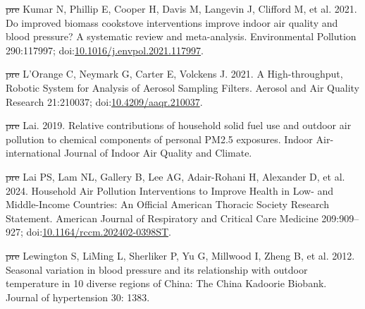 \documentclass[
  letterpaper,
  DIV=11,
  numbers=noendperiod]{scrartcl}
\newlength{\cslhangindent}
\newenvironment{CSLReferences}[2] %
 {\begin{list}{}{%
  \setlength{\itemindent}{0pt} %
  \setlength{\leftmargin}{0pt} %
  \setlength{\parsep}{0pt} %
  \ifodd #1
   \setlength{\leftmargin}{\cslhangindent} %
   \setlength{\itemindent}{-1\cslhangindent} %
  \fi
  \setlength{\itemsep}{#2\baselineskip}}} %
 {\end{list}} %
\providecommand{\DIFdel}[1]{{\protect\color{red}\sout{#1}}}                      %
\providecommand{\DIFaddbegin}{} %
\providecommand{\DIFaddend}{} %
\providecommand{\DIFdelbegin}{} %
\providecommand{\DIFdelend}{} %
\newcommand{\DIFscaledelfig}{0.5}
\newlength{\DIFdelgraphicswidth} %
\newlength{\DIFdelgraphicsheight} %
\newcommand{\DIFaddincludegraphics}[2][]{{\color{blue}\fbox{\DIFOincludegraphics[#1]{#2}}}} %
\newcommand{\DIFdelincludegraphics}[2][]{%
\sbox{\DIFdelgraphicsbox}{\DIFOincludegraphics[#1]{#2}}%
\settoboxwidth{\DIFdelgraphicswidth}{\DIFdelgraphicsbox} %
\settoboxtotalheight{\DIFdelgraphicsheight}{\DIFdelgraphicsbox} %
\scalebox{\DIFscaledelfig}{%
\parbox[b]{\DIFdelgraphicswidth}{\usebox{\DIFdelgraphicsbox}\\[-\baselineskip] \rule{\DIFdelgraphicswidth}{0em}}\llap{\resizebox{\DIFdelgraphicswidth}{\DIFdelgraphicsheight}{%
\setlength{\unitlength}{\DIFdelgraphicswidth}%
\begin{picture}(1,1)%
\thicklines\linethickness{2pt} %
{\color[rgb]{1,0,0}\put(0,0){\framebox(1,1){}}}%
{\color[rgb]{1,0,0}\put(0,0){\line( 1,1){1}}}%
{\color[rgb]{1,0,0}\put(0,1){\line(1,-1){1}}}%
\end{picture}%
}\hspace*{3pt}}} %
} %
\DeclareRobustCommand{\DIFaddbegin}{\DIFOaddbegin \let\includegraphics\DIFaddincludegraphics} %
\DeclareRobustCommand{\DIFaddend}{\DIFOaddend \let\includegraphics\DIFOincludegraphics} %
\DeclareRobustCommand{\DIFdelbegin}{\DIFOdelbegin \let\includegraphics\DIFdelincludegraphics} %
\DeclareRobustCommand{\DIFdelend}{\DIFOaddend \let\includegraphics\DIFOincludegraphics} %
\begin{document}
\begin{CSLReferences}{1}{1}
\DIFdelbegin %
\DIFdel{pre}%
\DIFdelend \DIFaddbegin {}
\DIFaddend Kumar N, Phillip E, Cooper H, Davis M, Langevin J, Clifford M, et al.
2021. Do improved biomass cookstove interventions improve indoor air
quality and blood pressure? {A} systematic review and meta-analysis.
Environmental Pollution 290:117997;
doi:\href{https://doi.org/10.1016/j.envpol.2021.117997}{10.1016/j.envpol.2021.117997}.

\DIFdelbegin %
\DIFdel{pre}%
\DIFdelend \DIFaddbegin {}
\DIFaddend L'Orange C, Neymark G, Carter E, Volckens J. 2021. A {High-throughput},
{Robotic System} for {Analysis} of {Aerosol Sampling Filters}. Aerosol
and Air Quality Research 21:210037;
doi:\href{https://doi.org/10.4209/aaqr.210037}{10.4209/aaqr.210037}.

\DIFdelbegin %
\DIFdel{pre}%
\DIFdelend \DIFaddbegin {}
\DIFaddend Lai. 2019. Relative contributions of household solid fuel use and
outdoor air pollution to chemical components of personal {PM2}.5
exposures. Indoor Air-international Journal of Indoor Air Quality and
Climate.

\DIFdelbegin %
\DIFdel{pre}%
\DIFdelend \DIFaddbegin {}
\DIFaddend Lai PS, Lam NL, Gallery B, Lee AG, Adair-Rohani H, Alexander D, et al.
2024. Household {Air Pollution Interventions} to {Improve Health} in
{Low-} and {Middle-Income Countries}: {An Official American Thoracic
Society Research Statement}. American Journal of Respiratory and
Critical Care Medicine 209:909--927;
doi:\href{https://doi.org/10.1164/rccm.202402-0398ST}{10.1164/rccm.202402-0398ST}.

\DIFdelbegin %
\DIFdel{pre}%
\DIFdelend \DIFaddbegin {}
\DIFaddend Lewington S, LiMing L, Sherliker P, Yu G, Millwood I, Zheng B, et al.
2012. Seasonal variation in blood pressure and its relationship with
outdoor temperature in 10 diverse regions of {China}: The {China
Kadoorie Biobank}. Journal of hypertension 30: 1383.


\end{CSLReferences}
\end{document}
